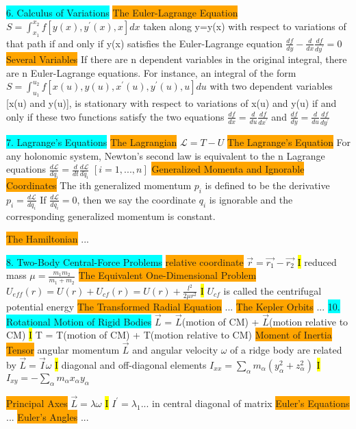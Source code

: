 \documentclass[10pt, oneside]{article}   	%
\begin{document}
\colorbox{Cyan}{6. Calculus of Variations}
\colorbox{Orange}{The Euler-Lagrange Equation}
$S = \int_{x_1}^{x_2} f[y(x),y^{\prime}(x),x]dx$ taken along y=y(x) with respect to variations of that path if and only if y(x) satisfies the Euler-Lagrange equation
$\frac{df}{dy}-\frac{d}{dx}\frac{df}{dy^{\prime}} = 0$
\colorbox{Orange}{Several Variables}
If there are n dependent variables in the original integral, there are n Euler-Lagrange equations. 
For instance, an integral of the form $S = \int_{u_1}^{u_2} f[x(u),y(u),x^{\prime}(u),y^{\prime}(u),u]du$
with two dependent variables [x(u) and y(u)], is stationary with respect to variations of x(u) and y(u) if and only if these two functions satisfy the two equations
$\frac{df}{dx}=\frac{d}{du}\frac{df}{dx^{\prime}}$ and
$\frac{df}{dy}=\frac{d}{du}\frac{df}{dy^{\prime}}$

\colorbox{Cyan}{7. Lagrange's Equations}
\colorbox{Orange}{The Lagrangian}
$\mathcal{L} = T-U$
\colorbox{Orange}{The Lagrange's Equation}
For any holonomic system, Newton's second law is equivalent to the n Lagrange equations
$\frac{d \mathcal{L}}{dq_i} = \frac{d}{dt}\frac{d \mathcal{L}}{d \dot{q_i}} $
$[i=1,...,n]$
\colorbox{Orange}{Generalized Momenta and Ignorable Coordinates}
The ith generalized momentum $p_i$ is defined to be the derivative
$p_i = \frac{d \mathcal{L}}{d \dot{q_i}}$
If $ \frac{d \mathcal{L}}{d \dot{q_i}} = 0$, then we say the coordinate $q_i$ is ignorable and the corresponding generalized momentum is constant.

\colorbox{Orange}{The Hamiltonian}
...

\colorbox{Cyan}{8. Two-Body Central-Force Problems}
\colorbox{Orange}{relative coordinate}
$\vec{r} = \vec{r_1} - \vec{r_2}$
\hl{I}
reduced mass $\mu = \frac{m_1 m_2}{m_1 + m_2}$
\colorbox{Orange}{The Equivalent One-Dimensional Problem}
$U_{eff}(r) = U(r) + U_{cf}(r) = U(r) + \frac{l^2}{2\mu r^2}$
\hl{I}
$U_{cf}$ is called the centrifugal potential energy 
\colorbox{Orange}{The Transformed Radial Equation}
...
\colorbox{Orange}{The Kepler Orbits}
...
\colorbox{Cyan}{10. Rotational Motion of Rigid Bodies}
$\vec{L}$ = $\vec{L}$(motion of CM) + $\vec{L}$(motion relative to CM)
\hl{I}
T = T(motion of CM) + T(motion relative to CM)
\colorbox{Orange}{Moment of Inertia Tensor}
angular momentum $\vec{L}$ and angular velocity $\omega$ of a ridge body are related by $\vec{L} = \vec{I}\omega$
\hl{I}
diagonal and off-diagonal elements
$I_{xx}=\sum_{\alpha} m_{\alpha} (y_{\alpha}^2 + z_{\alpha}^2 )$
\hl{I}
$I_{xy}= -\sum_{\alpha} m_{\alpha} x_{\alpha} y_{\alpha} $

\colorbox{Orange}{Principal Axes}
$\vec{L} = \lambda \omega $
\hl{I}
$I^{\prime} = \lambda_1 $... in central diagonal of matrix
\colorbox{Orange}{Euler's Equations}
...
\colorbox{Orange}{Euler's Angles}
...












\end{document}
